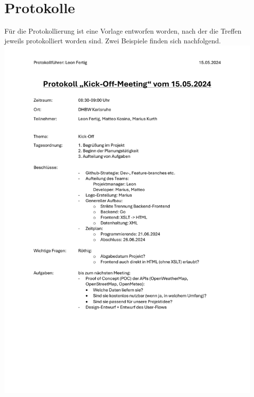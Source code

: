 \documentclass[12pt]{article}
\begin{document}
\section{Protokolle}
Für die Protokollierung ist eine Vorlage entworfen worden, nach der die Treffen jeweils protokolliert worden sind. Zwei Beispiele finden sich nachfolgend.
\newline
\includegraphics[width=\textwidth]{Planungsdokumente/graphics/Protokoll1.pdf}
\end{document}
